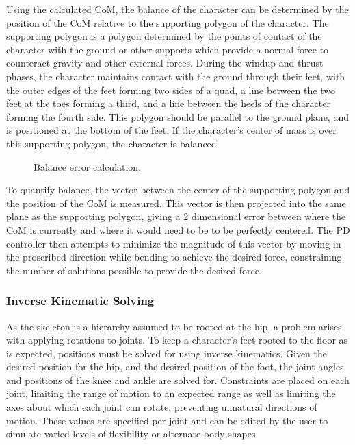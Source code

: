 Using the calculated CoM, the balance of the character can be determined by the position of the CoM relative to the supporting polygon of the character.  The supporting polygon is a polygon determined by the points of contact of the character with the ground or other supports which provide a normal force to counteract gravity and other external forces.  During the windup and thrust phases, the character maintains contact with the ground through their feet, with the outer edges of the feet forming two sides of a quad, a line between the two feet at the toes forming a third, and a line between the heels of the character forming the fourth side.  This polygon should be parallel to the ground plane, and is positioned at the bottom of the feet.  If the character's center of mass is over this supporting polygon, the character is balanced.

\begin{figure}[ht]
	\centering
	\caption[Algorithm diagram for calculation of balance error]{Balance error calculation.}
	\label{fig:balanceErr}
\end{figure}

To quantify balance, the vector between the center of the supporting polygon and the position of the CoM is measured.  This vector is then projected into the same plane as the supporting polygon, giving a 2 dimensional error between where the CoM is currently and where it would need to be to be perfectly centered.  The PD controller then attempts to minimize the magnitude of this vector by moving in the proscribed direction while bending to achieve the desired force, constraining the number of solutions possible to provide the desired force.

\subsubsection{Inverse Kinematic Solving}
As the skeleton is a hierarchy assumed to be rooted at the hip, a problem arises with applying rotations to joints.  To keep a character's feet rooted to the floor as is expected, positions must be solved for using inverse kinematics.  Given the desired position for the hip, and the desired position of the foot, the joint angles and positions of the knee and ankle are solved for.  Constraints are placed on each joint, limiting the range of motion to an expected range as well as limiting the axes about which each joint can rotate, preventing unnatural directions of motion.  These values are specified per joint and can be edited by the user to simulate varied levels of flexibility or alternate body shapes.

